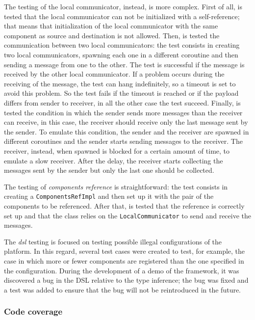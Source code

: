 The testing of the local communicator, instead, is more complex.
First of all, is tested that the local communicator can not be initialized with a self-reference; that means that initialization of the local
communicator with the same component as source and destination is not allowed.
Then, is tested the communication between two local communicators: the test consists in creating two local communicators, spawning each one in a
different coroutine and then sending a message from one to the other. The test is successful if the message is received by the other local
communicator. If a problem occurs during the receiving of the message, the test can hang indefinitely, so a timeout is set to avoid this problem.
So the test fails if the timeout is reached or if the payload differs from sender to receiver, in all the other case the test succeed.
Finally, is tested the condition in which the sender sends more messages than the receiver can receive, in this case, the receiver should receive
only the last message sent by the sender. To emulate this condition, the sender and the receiver are spawned in different coroutines and the sender
starts sending messages to the receiver. The receiver, instead, when spawned is blocked for a certain amount of time, to emulate a slow receiver.
After the delay, the receiver starts collecting the messages sent by the sender but only the last one should be collected.

The testing of \emph{components reference} is straightforward: the test consists in creating a \texttt{ComponentsRefImpl} and then set up
it with the pair of the components to be referenced. After that, is tested that the reference is correctly set up and that the class
relies on the \texttt{LocalCommunicator} to send and receive the messages.

The \emph{dsl} testing is focused on testing possible illegal configurations of the platform. In this regard, several test cases were
created to test, for example, the case in which more or fewer components are registered than the one specified in the configuration.
During the development of a demo of the framework, it was discovered a bug in the DSL relative to the type inference; the bug was fixed and a test
was added to ensure that the bug will not be reintroduced in the future.

\subsubsection{Code coverage}

